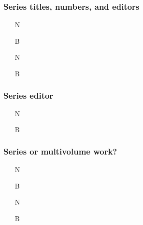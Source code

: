 \documentclass[11pt,letterpaper,oneside]{article}
\begin{document}
\subsubsection{Series titles, numbers, and editors}
\label{14.128}

\begin{itemize}
\item[N] 

\item[B] 

\item[N] 

\item[B] 
\end{itemize}

\subsubsection{Series editor}

\begin{itemize}
\item[N] 

\item[B] 
\end{itemize}

\subsubsection{Series or multivolume work?}
\label{14.130}

\begin{itemize}
\item[N] 

\item[B] 

\item[N] 

\item[B] 
\end{itemize}

\end{document}
